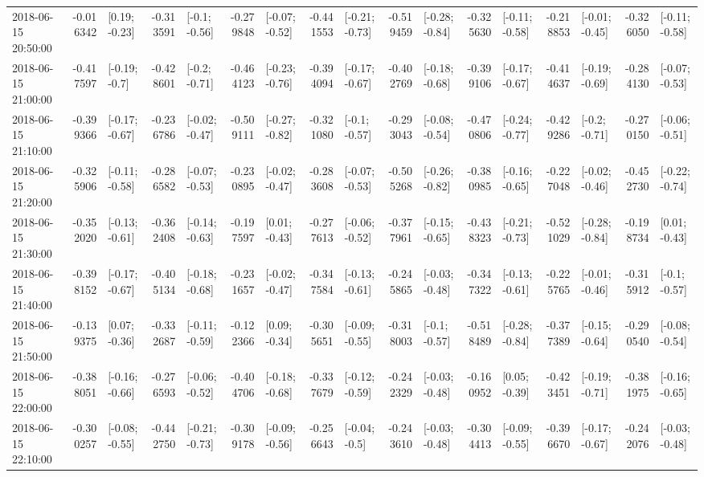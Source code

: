 \begin{tabular}{lrlrlrlrlrlrlrlrl}
2018-06-15 20:50:00 & -0.016342 &   [0.19; -0.23] & -0.313591 &   [-0.1; -0.56] & -0.279848 &  [-0.07; -0.52] & -0.441553 &  [-0.21; -0.73] & -0.519459 &  [-0.28; -0.84] & -0.325630 &  [-0.11; -0.58] & -0.218853 &  [-0.01; -0.45] & -0.326050 &  [-0.11; -0.58] \\
2018-06-15 21:00:00 & -0.417597 &   [-0.19; -0.7] & -0.428601 &   [-0.2; -0.71] & -0.464123 &  [-0.23; -0.76] & -0.394094 &  [-0.17; -0.67] & -0.402769 &  [-0.18; -0.68] & -0.399106 &  [-0.17; -0.67] & -0.414637 &  [-0.19; -0.69] & -0.284130 &  [-0.07; -0.53] \\
2018-06-15 21:10:00 & -0.399366 &  [-0.17; -0.67] & -0.236786 &  [-0.02; -0.47] & -0.509111 &  [-0.27; -0.82] & -0.321080 &   [-0.1; -0.57] & -0.293043 &  [-0.08; -0.54] & -0.470806 &  [-0.24; -0.77] & -0.429286 &   [-0.2; -0.71] & -0.270150 &  [-0.06; -0.51] \\
2018-06-15 21:20:00 & -0.325906 &  [-0.11; -0.58] & -0.286582 &  [-0.07; -0.53] & -0.230895 &  [-0.02; -0.47] & -0.283608 &  [-0.07; -0.53] & -0.505268 &  [-0.26; -0.82] & -0.380985 &  [-0.16; -0.65] & -0.227048 &  [-0.02; -0.46] & -0.452730 &  [-0.22; -0.74] \\
2018-06-15 21:30:00 & -0.352020 &  [-0.13; -0.61] & -0.362408 &  [-0.14; -0.63] & -0.197597 &   [0.01; -0.43] & -0.277613 &  [-0.06; -0.52] & -0.377961 &  [-0.15; -0.65] & -0.438323 &  [-0.21; -0.73] & -0.521029 &  [-0.28; -0.84] & -0.198734 &   [0.01; -0.43] \\
2018-06-15 21:40:00 & -0.398152 &  [-0.17; -0.67] & -0.405134 &  [-0.18; -0.68] & -0.231657 &  [-0.02; -0.47] & -0.347584 &  [-0.13; -0.61] & -0.245865 &  [-0.03; -0.48] & -0.347322 &  [-0.13; -0.61] & -0.225765 &  [-0.01; -0.46] & -0.315912 &   [-0.1; -0.57] \\
2018-06-15 21:50:00 & -0.139375 &   [0.07; -0.36] & -0.332687 &  [-0.11; -0.59] & -0.122366 &   [0.09; -0.34] & -0.305651 &  [-0.09; -0.55] & -0.318003 &   [-0.1; -0.57] & -0.518489 &  [-0.28; -0.84] & -0.377389 &  [-0.15; -0.64] & -0.290540 &  [-0.08; -0.54] \\
2018-06-15 22:00:00 & -0.388051 &  [-0.16; -0.66] & -0.276593 &  [-0.06; -0.52] & -0.404706 &  [-0.18; -0.68] & -0.337679 &  [-0.12; -0.59] & -0.242329 &  [-0.03; -0.48] & -0.160952 &   [0.05; -0.39] & -0.423451 &  [-0.19; -0.71] & -0.381975 &  [-0.16; -0.65] \\
2018-06-15 22:10:00 & -0.300257 &  [-0.08; -0.55] & -0.442750 &  [-0.21; -0.73] & -0.309178 &  [-0.09; -0.56] & -0.256643 &   [-0.04; -0.5] & -0.243610 &  [-0.03; -0.48] & -0.304413 &  [-0.09; -0.55] & -0.396670 &  [-0.17; -0.67] & -0.242076 &  [-0.03; -0.48] \\

\end{tabular}
